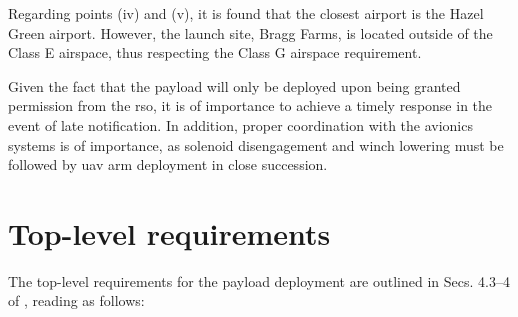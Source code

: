 	Regarding points (iv) and (v), it is found that the closest airport is the Hazel Green airport. However, the launch site, Bragg Farms, is located outside of the Class E airspace, thus respecting the Class G airspace requirement.

 Given the fact that the payload will only be deployed upon being granted permission from the \gls{rso}, it is of importance to achieve a timely response in the event of late notification. In addition, proper coordination with the avionics systems is of importance, as solenoid disengagement and winch lowering must be followed by \gls{uav} arm deployment in close succession.

\section{Top-level requirements}\label{PL:Requirements:TopLevel}

	The top-level requirements for the payload deployment are outlined in Secs. 4.3--4 of \citep{MSFC2019}, reading as follows:

